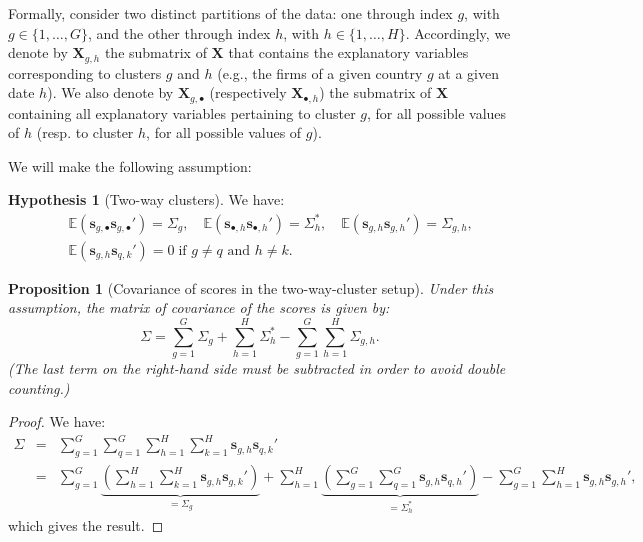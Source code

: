 \documentclass[
  12pt,
]{book}
\newtheorem{proposition}{Proposition}[chapter]
\theoremstyle{definition}
\theoremstyle{definition}
\theoremstyle{definition}
\theoremstyle{definition}
\newtheorem{hypothesis}{Hypothesis}[chapter]
\theoremstyle{remark}
\begin{document}
Formally, consider two distinct partitions of the data: one through index \(g\), with \(g \in \{1,\dots,G\}\), and the other through index \(h\), with \(h \in \{1,\dots,H\}\). Accordingly, we denote by \(\mathbf{X}_{g,h}\) the submatrix of \(\mathbf{X}\) that contains the explanatory variables corresponding to clusters \(g\) and \(h\) (e.g., the firms of a given country \(g\) at a given date \(h\)). We also denote by \(\mathbf{X}_{g,\bullet}\) (respectively \(\mathbf{X}_{\bullet,h}\)) the submatrix of \(\mathbf{X}\) containing all explanatory variables pertaining to cluster \(g\), for all possible values of \(h\) (resp. to cluster \(h\), for all possible values of \(g\)).

We will make the following assumption:

\begin{hypothesis}[Two-way clusters]
\protect\hypertarget{hyp:twowaycluster}{}\label{hyp:twowaycluster}We have:
\begin{eqnarray*}
&&\mathbb{E}(\mathbf{s}_{g,\bullet}\mathbf{s}_{g,\bullet}')=\Sigma_g,\quad \mathbb{E}(\mathbf{s}_{\bullet,h}\mathbf{s}_{\bullet,h}')=\Sigma^*_h,\quad \mathbb{E}(\mathbf{s}_{g,h}\mathbf{s}_{g,h}')=\Sigma_{g,h},\\ &&\mathbb{E}(\mathbf{s}_{g,h}\mathbf{s}_{q,k}')=0\;\mbox{if }g\neq q\mbox{ and }h \ne k.
\end{eqnarray*}
\end{hypothesis}

\begin{proposition}[Covariance of scores in the two-way-cluster setup]
\protect\hypertarget{prp:twoWayCov}{}\label{prp:twoWayCov}Under this assumption, the matrix of covariance of the scores is given by:
\[
\Sigma = \sum_{g=1}^G \Sigma_{g} + \sum_{h=1}^H \Sigma^*_{h} - \sum_{g=1}^G\sum_{h=1}^H \Sigma_{g,h}.
\]
(The last term on the right-hand side must be subtracted in order to avoid double counting.)
\end{proposition}

\begin{proof}
We have:
\begin{eqnarray*}
\Sigma &=& \sum_{g=1}^G\sum_{q=1}^G\sum_{h=1}^H\sum_{k=1}^H \mathbf{s}_{g,h}\mathbf{s}_{q,k}'\\
&=& \sum_{g=1}^G\underbrace{\left(\sum_{h=1}^H\sum_{k=1}^H \mathbf{s}_{g,h}\mathbf{s}_{g,k}'\right)}_{=\Sigma_g}+\sum_{h=1}^H\underbrace{\left(\sum_{g=1}^G\sum_{q=1}^G \mathbf{s}_{g,h}\mathbf{s}_{q,h}'\right)}_{=\Sigma^*_h}-\sum_{g=1}^G\sum_{h=1}^H \mathbf{s}_{g,h}\mathbf{s}_{g,h}',
\end{eqnarray*}
which gives the result.
\end{proof}
\end{document}
